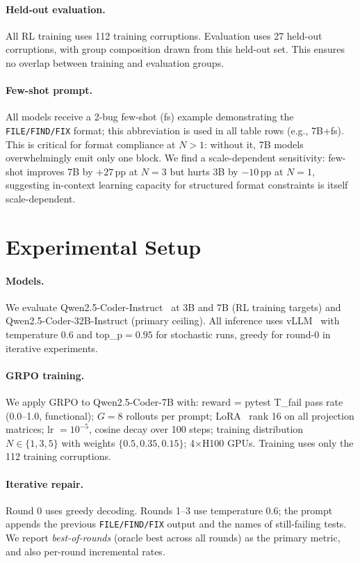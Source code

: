 \documentclass[12pt]{article}
\begin{document}
\paragraph{Held-out evaluation.}
All RL training uses 112 training corruptions. Evaluation uses 27 held-out
corruptions, with group composition drawn from this held-out set. This ensures
no overlap between training and evaluation groups.

\paragraph{Few-shot prompt.}
All models receive a 2-bug few-shot (fs) example demonstrating the \texttt{FILE/FIND/FIX}
format; this abbreviation is used in all table rows (e.g., 7B+fs). This is critical for format compliance at $N{>}1$: without it, 7B
models overwhelmingly emit only one block. We find a scale-dependent sensitivity:
few-shot improves 7B by $+27$\,pp at $N{=}3$ but hurts 3B by $-10$\,pp at
$N{=}1$, suggesting in-context learning capacity for structured format
constraints is itself scale-dependent.

\section{Experimental Setup}
\label{sec:setup}

\paragraph{Models.}
We evaluate Qwen2.5-Coder-Instruct~\cite{hui2024qwen25coder} at 3B and 7B
(RL training targets) and Qwen2.5-Coder-32B-Instruct (primary ceiling).
All inference uses vLLM~\cite{kwon2023vllm} with temperature 0.6 and
top\_p$=0.95$ for stochastic runs, greedy for round-0 in iterative experiments.

\paragraph{GRPO training.}
We apply GRPO to Qwen2.5-Coder-7B with:
reward = pytest T\_fail pass rate (0.0--1.0, functional);
$G{=}8$ rollouts per prompt; LoRA~\cite{hu2022lora} rank 16 on all projection matrices;
lr $= 10^{-5}$, cosine decay over 100 steps; training distribution
$N \in \{1, 3, 5\}$ with weights $\{0.5, 0.35, 0.15\}$; 4$\times$H100 GPUs.
Training uses only the 112 training corruptions.

\paragraph{Iterative repair.}
Round 0 uses greedy decoding. Rounds 1--3 use temperature 0.6; the prompt
appends the previous \texttt{FILE/FIND/FIX} output and the names of still-failing
tests. We report \emph{best-of-rounds} (oracle best across all rounds) as the
primary metric, and also per-round incremental rates.
\end{document}
